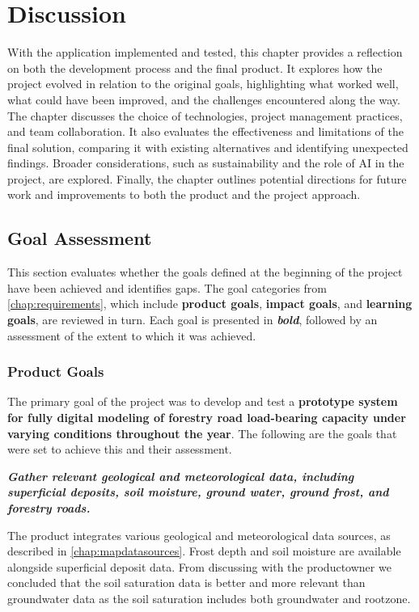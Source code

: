 \chapter{Discussion}\label{chap:discussion}

With the application implemented and tested, this chapter provides a reflection on both the development process and the final product. It explores how the project evolved in relation to the original goals, highlighting what worked well, what could have been improved, and the challenges encountered along the way. The chapter discusses the choice of technologies, project management practices, and team collaboration. It also evaluates the effectiveness and limitations of the final solution, comparing it with existing alternatives and identifying unexpected findings. Broader considerations, such as sustainability and the role of AI in the project, are explored. Finally, the chapter outlines potential directions for future work and improvements to both the product and the project approach.

\section{Goal Assessment}

This section evaluates whether the goals defined at the beginning of the project have been achieved and identifies gaps. The goal categories from \autoref{chap:requirements}, which include \textbf{product goals}, \textbf{impact goals}, and \textbf{learning goals}, are reviewed in turn. Each goal is presented in \textit{\textbf{bold}}, followed by an assessment of the extent to which it was achieved.

\subsection{Product Goals}

The primary goal of the project was to develop and test a \textbf{prototype system for fully digital modeling of forestry road load-bearing capacity under varying conditions throughout the year}. The following are the goals that were set to achieve this and their assessment.   

\textbf{\textit{Gather relevant geological and meteorological data, including superficial deposits, soil moisture, ground water, ground frost, and forestry roads.}}

The product integrates various geological and meteorological data sources, as described in \autoref{chap:mapdatasources}. Frost depth and soil moisture are available alongside superficial deposit data. From discussing with the \Gls{productowner} we concluded that the soil saturation data is better and more relevant than groundwater data as the soil saturation includes both \gls{groundwater} and \gls{rootzone}. 

